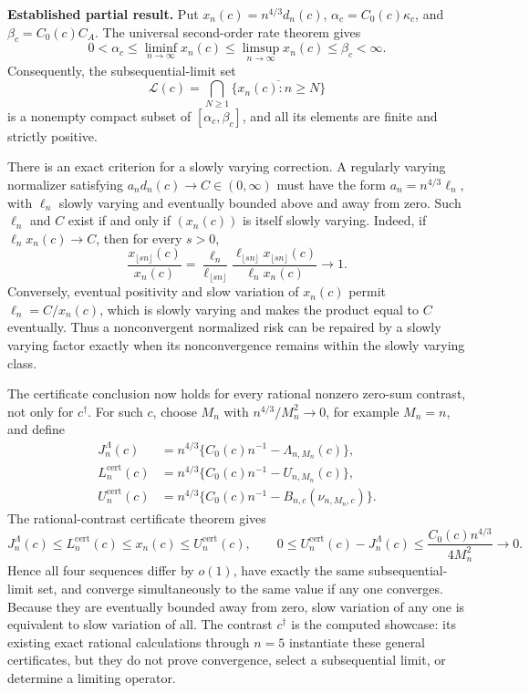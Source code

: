 \textbf{Established partial result.}
Put \(x_n(c)=n^{4/3}d_n(c)\), \(\alpha_c=C_0(c)\kappa_c\), and \(\beta_c=C_0(c)C_A\).  The universal second-order rate theorem gives
\[
 0<\alpha_c\leq\liminf_{n\to\infty}x_n(c)
 \leq\limsup_{n\to\infty}x_n(c)\leq\beta_c<\infty.
\]
Consequently, the subsequential-limit set
\[
 \mathcal L(c)=\bigcap_{N\geq1}
 \overline{\{x_n(c):n\geq N\}}
\]
is a nonempty compact subset of \([\alpha_c,\beta_c]\), and all its elements are finite and strictly positive.

There is an exact criterion for a slowly varying correction.  A regularly varying normalizer satisfying \(a_nd_n(c)\to C\in(0,\infty)\) must have the form \(a_n=n^{4/3}\ell_n\), with \(\ell_n\) slowly varying and eventually bounded above and away from zero.  Such \(\ell_n\) and \(C\) exist if and only if \((x_n(c))\) is itself slowly varying.  Indeed, if \(\ell_nx_n(c)\to C\), then for every \(s>0\),
\[
 \frac{x_{\lfloor sn\rfloor}(c)}{x_n(c)}
 =\frac{\ell_n}{\ell_{\lfloor sn\rfloor}}
 \frac{\ell_{\lfloor sn\rfloor}x_{\lfloor sn\rfloor}(c)}
 {\ell_nx_n(c)}\longrightarrow1.
\]
Conversely, eventual positivity and slow variation of \(x_n(c)\) permit \(\ell_n=C/x_n(c)\), which is slowly varying and makes the product equal to \(C\) eventually.  Thus a nonconvergent normalized risk can be repaired by a slowly varying factor exactly when its nonconvergence remains within the slowly varying class.

The certificate conclusion now holds for every rational nonzero zero-sum contrast, not only for \(c^\dagger\).  For such \(c\), choose \(M_n\) with \(n^{4/3}/M_n^2\to0\), for example \(M_n=n\), and define
\[
 \begin{aligned}
 J_n^{\Lambda}(c)&=n^{4/3}\{C_0(c)n^{-1}-\Lambda_{n,M_n}(c)\},\\
 L_n^{\mathrm{cert}}(c)&=n^{4/3}\{C_0(c)n^{-1}-U_{n,M_n}(c)\},\\
 U_n^{\mathrm{cert}}(c)&=n^{4/3}\{C_0(c)n^{-1}-B_{n,c}(\nu_{n,M_n,c})\}.
 \end{aligned}
\]
The rational-contrast certificate theorem gives
\[
 J_n^{\Lambda}(c)\leq L_n^{\mathrm{cert}}(c)
 \leq x_n(c)\leq U_n^{\mathrm{cert}}(c),
 \qquad
 0\leq U_n^{\mathrm{cert}}(c)-J_n^{\Lambda}(c)
 \leq\frac{C_0(c)n^{4/3}}{4M_n^2}\longrightarrow0.
\]
Hence all four sequences differ by \(o(1)\), have exactly the same subsequential-limit set, and converge simultaneously to the same value if any one converges.  Because they are eventually bounded away from zero, slow variation of any one is equivalent to slow variation of all.  The contrast \(c^\dagger\) is the computed showcase: its existing exact rational calculations through \(n=5\) instantiate these general certificates, but they do not prove convergence, select a subsequential limit, or determine a limiting operator.